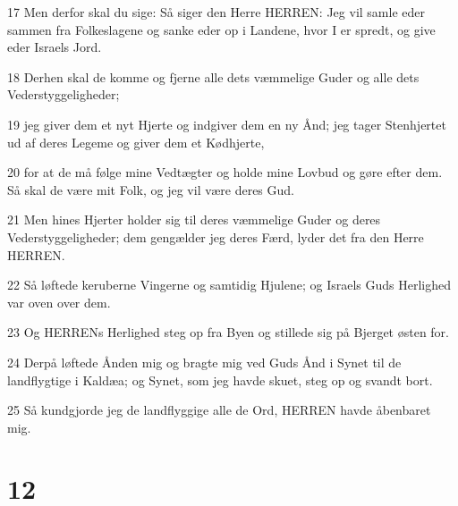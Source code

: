 \par 17 Men derfor skal du sige: Så siger den Herre HERREN: Jeg vil samle eder sammen fra Folkeslagene og sanke eder op i Landene, hvor I er spredt, og give eder Israels Jord.
\par 18 Derhen skal de komme og fjerne alle dets væmmelige Guder og alle dets Vederstyggeligheder;
\par 19 jeg giver dem et nyt Hjerte og indgiver dem en ny Ånd; jeg tager Stenhjertet ud af deres Legeme og giver dem et Kødhjerte,
\par 20 for at de må følge mine Vedtægter og holde mine Lovbud og gøre efter dem. Så skal de være mit Folk, og jeg vil være deres Gud.
\par 21 Men hines Hjerter holder sig til deres væmmelige Guder og deres Vederstyggeligheder; dem gengælder jeg deres Færd, lyder det fra den Herre HERREN.
\par 22 Så løftede keruberne Vingerne og samtidig Hjulene; og Israels Guds Herlighed var oven over dem.
\par 23 Og HERRENs Herlighed steg op fra Byen og stillede sig på Bjerget østen for.
\par 24 Derpå løftede Ånden mig og bragte mig ved Guds Ånd i Synet til de landflygtige i Kaldæa; og Synet, som jeg havde skuet, steg op og svandt bort.
\par 25 Så kundgjorde jeg de landflyggige alle de Ord, HERREN havde åbenbaret mig.

\chapter{12}

